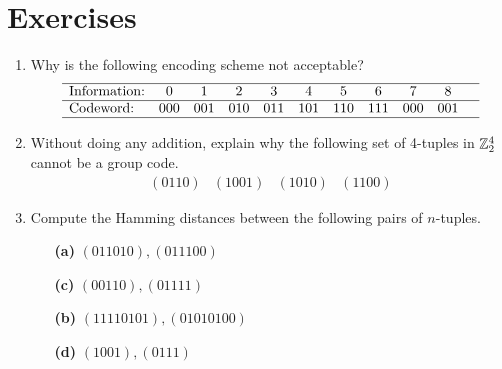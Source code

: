  
\section*{Exercises}
\exrule
 
 
 
{\small
\begin{enumerate}
 
 
\bf\item\rm
Why is the following encoding scheme not acceptable?
\[
\begin{array}{lcccccccccc}
\hline
\mbox{Information:} & 0 & 1 & 2 & 3 & 4 & 5 & 6 & 7 & 8 &
\\ \hline
\mbox{Codeword:} & 000 & 001 & 010 & 011 & 101 & 110
& 111 & 000 & 001 \\ \hline
\end{array}
\]
 
 
\bf\item\rm
Without doing any addition, explain why the following set of 4-tuples in
${\Bbb Z}_2^4$ cannot be a group code. 
\[
\begin{array}{cccc}
(0110) & (1001) & (1010) & (1100)
\end{array}
\]
 
 
\bf\item\rm    %
Compute the Hamming distances between the following pairs of
$n$-tuples. 
 
\vspace{3pt}        %
 
\hspace{-7pt}
\begin{minipage}[t]{4.6in}
\noindent
\begin{minipage}[t]{2.25in}
\begin{itemize}
 
 \item[{\bf (a)}]
$(011010), (011100)$
 
 \item[{\bf (c)}]
$(00110), (01111)$
 
 
\end{itemize}
\end{minipage} \hfill
\begin{minipage}[t]{2.25in}
\begin{itemize}
 
 \item[{\bf (b)}]
$(11110101), (01010100)$
 
 \item[{\bf (d)}]
$(1001), (0111)$
 

\end{itemize}
\end{minipage}
\end{minipage}
\end{enumerate}}

